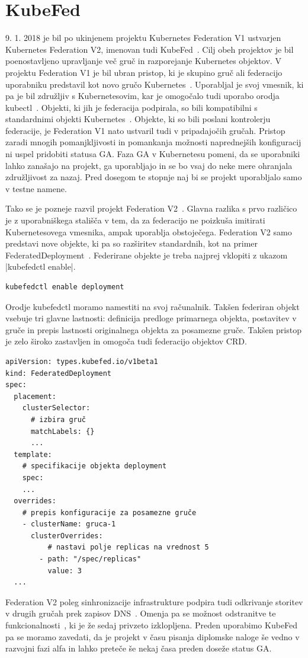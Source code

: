 \documentclass[a4paper, 12pt]{book}
\begin{document}
\section{KubeFed}
9. 1. 2018 je bil po ukinjenem projektu Kubernetes Federation V1 ustvarjen Kubernetes Federation V2, imenovan tudi KubeFed~\cite{kubernetes-federation-evolution}.
Cilj obeh projektov je bil poenostavljeno upravljanje več gruč in razporejanje Kubernetes objektov.
V projektu Federation V1 je bil ubran pristop, ki je skupino gruč ali federacijo uporabniku predstavil kot novo gručo Kubernetes~\cite{setup-cluster-federation-kubefed-v1}.
Uporabljal je svoj vmesnik, ki pa je bil združljiv s Kubernetesovim, kar je omogočalo tudi uporabo orodja kubectl~\cite{cluster-federation-in-Kubernetes-1.5}.
Objekti, ki jih je federacija podpirala, so bili kompatibilni s standardnimi objekti Kubernetes~\cite{federated-cluster-kubefed-v1}.
Objekte, ki so bili poslani kontrolerju federacije, je Federation V1 nato ustvaril tudi v pripadajočih gručah.
Pristop zaradi mnogih pomanjkljivosti in pomankanja možnosti naprednejših konfiguracij ni uspel pridobiti statusa GA.
Faza GA v Kubernetesu pomeni, da se uporabniki lahko zanašajo na projekt, ga uporabljajo in se bo vsaj do neke mere ohranjala združljivost za nazaj.
Pred dosegom te stopnje naj bi se projekt uporabljalo samo v testne namene.

Tako se je pozneje razvil projekt Federation V2~\cite{kubernetes-federation-evolution}.
Glavna razlika s prvo različico je z uporabniškega stališča v tem, da za federacijo ne poizkuša imitirati Kubernetesovega vmesnika, ampak uporablja obstoječega. 
Federation V2 samo predstavi nove objekte, ki pa so razširitev standardnih, kot na primer FederatedDeployment~\cite{kubefed-userguide}.
Federirane objekte je treba najprej vklopiti z ukazom \spverb|kubefedctl enable|.
\begin{verbatim}
kubefedctl enable deployment
\end{verbatim}
Orodje kubefedctl moramo namestiti na svoj računalnik.
Takšen federiran objekt vsebuje tri glavne lastnosti: definicija predloge primarnega objekta, postavitev v gruče in prepis lastnosti originalnega objekta za posamezne gruče.
Takšen pristop je zelo široko zastavljen in omogoča tudi federacijo objektov CRD.
\begin{verbatim}
apiVersion: types.kubefed.io/v1beta1
kind: FederatedDeployment
spec:
  placement:
    clusterSelector:
      # izbira gruč
      matchLabels: {}
      ... 
  template:
    # specifikacije objekta deployment
    spec:
    ... 
  overrides:
    # prepis konfiguracije za posamezne gruče
    - clusterName: gruca-1
      clusterOverrides:
          # nastavi polje replicas na vrednost 5
        - path: "/spec/replicas"
          value: 3
  ... 
\end{verbatim}
Federation V2 poleg sinhronizacije infrastrukture podpira tudi odkrivanje storitev v drugih gručah prek zapisov DNS~\cite{kubefed-userguide}.
Omenja pa se možnost odstranitve te funkcionalnosti~\cite{remove-service-discovery}, ki je že sedaj privzeto izklopljena.
Preden uporabimo KubeFed pa se moramo zavedati, da je projekt v času pisanja diplomske naloge še vedno v razvojni fazi alfa in lahko preteče še nekaj časa preden doseže status GA.
\end{document}
